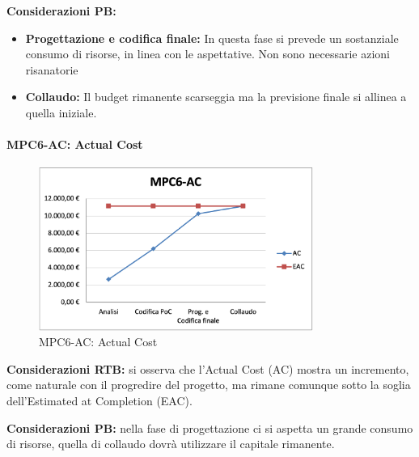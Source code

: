 \newpage

\noindent \textbf{Considerazioni PB:} 
\begin{itemize}
    \item \textbf{Progettazione e codifica finale:} In questa fase si prevede un sostanziale consumo di risorse, in linea con le aspettative. Non sono necessarie azioni risanatorie
    \item \textbf{Collaudo:} Il budget rimanente scarseggia ma la previsione finale si allinea a quella iniziale. 
\end{itemize}

\paragraph{MPC6-AC: Actual Cost}
\begin{figure}[h!] 
    \centering
    \includegraphics[width=0.8\textwidth]{images/MPC6-AC.png}
    \caption{MPC6-AC: Actual Cost}
\end{figure}
\noindent \textbf{Considerazioni RTB:} si osserva che l’Actual Cost (AC) mostra un incremento, come naturale con il progredire del progetto, ma rimane comunque sotto la soglia dell'Estimated at Completion (EAC). 

\vspace{0.5cm}
\noindent \textbf{Considerazioni PB:} nella fase di progettazione ci si aspetta un grande consumo di risorse, quella di collaudo dovrà utilizzare il capitale rimanente.


